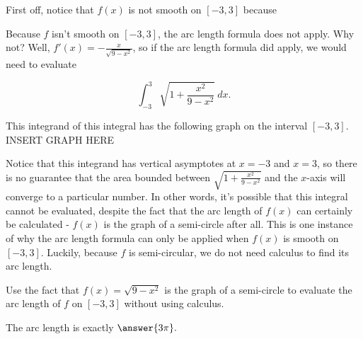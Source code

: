 \documentclass[handout,nooutcomes]{ximera}
\begin{document}
\begin{problem}
First off, notice that $f(x)$ is not smooth on $[-3,3]$ because 
\begin{selectAll}
\end{selectAll}
\end{problem}

Because $f$ isn't smooth on $[-3,3]$, the arc length formula does not apply.  Why not?  Well, $f'(x) = -\frac{x}{\sqrt{9-x^2}}$, so if the arc length formula did apply, we would need to evaluate 

$$\displaystyle\int_{-3}^{3} \sqrt{1+\frac{x^2}{9-x^2}} \ dx.$$ 

This integrand of this integral has the following graph on the interval $[-3,3].$  \\

INSERT GRAPH HERE

Notice that this integrand has vertical asymptotes at $x=-3$ and $x=3$, so there is no guarantee that the area bounded between $\sqrt{1+\frac{x^2}{9-x^2}}$ and the $x$-axis will converge to a particular number.  In other words, it's possible that this integral cannot be evaluated, despite the fact that the arc length of $f(x)$ can certainly be calculated - $f(x)$ is the graph of a semi-circle after all.  This is one instance of why the arc length formula can only be applied when $f(x)$ is smooth on $[-3,3]$.  Luckily, because $f$ is semi-circular, we do not need calculus to find its arc length. 

\begin{problem}
Use the fact that $f(x) = \sqrt{9-x^2}$ is the graph of a semi-circle to evaluate the arc length of $f$ on $[-3,3]$ without using calculus.  

The arc length is exactly $\answer{3\pi}.$
\end{problem}
\end{document}
